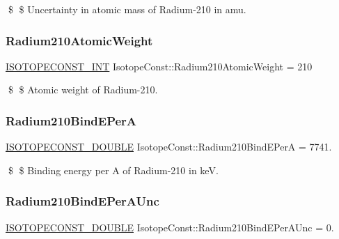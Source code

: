 \$ \$ Uncertainty in atomic mass of Radium-\/210 in amu. \mbox{\label{group___isotope_const-_radium-_ra210_gac0007c78165f86c23ccc82b24611270a}} 
\subsubsection{\texorpdfstring{Radium210\+Atomic\+Weight}{Radium210AtomicWeight}}
{\footnotesize\ttfamily \mbox{\hyperlink{group___isotope_const-_macros_ga5f18360b3e99483a35c32d789e62621c}{I\+S\+O\+T\+O\+P\+E\+C\+O\+N\+S\+T\+\_\+\+I\+NT}} Isotope\+Const\+::\+Radium210\+Atomic\+Weight = 210}

\$ \$ Atomic weight of Radium-\/210. \mbox{\label{group___isotope_const-_radium-_ra210_ga85634214dd2c5f3da9906935fc3c577a}} 
\subsubsection{\texorpdfstring{Radium210\+Bind\+E\+PerA}{Radium210BindEPerA}}
{\footnotesize\ttfamily \mbox{\hyperlink{group___isotope_const-_macros_ga8f45a7272ce02c0b4c65c44636ed719a}{I\+S\+O\+T\+O\+P\+E\+C\+O\+N\+S\+T\+\_\+\+D\+O\+U\+B\+LE}} Isotope\+Const\+::\+Radium210\+Bind\+E\+PerA = 7741.}

\$ \$ Binding energy per A of Radium-\/210 in keV. \mbox{\label{group___isotope_const-_radium-_ra210_ga2eca00a077dc29a51e694d9b4ff70824}} 
\subsubsection{\texorpdfstring{Radium210\+Bind\+E\+Per\+A\+Unc}{Radium210BindEPerAUnc}}
{\footnotesize\ttfamily \mbox{\hyperlink{group___isotope_const-_macros_ga8f45a7272ce02c0b4c65c44636ed719a}{I\+S\+O\+T\+O\+P\+E\+C\+O\+N\+S\+T\+\_\+\+D\+O\+U\+B\+LE}} Isotope\+Const\+::\+Radium210\+Bind\+E\+Per\+A\+Unc = 0.}

